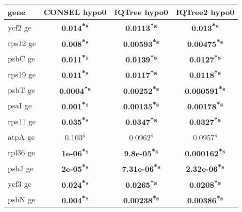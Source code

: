 \documentclass[a4paper]{article}
\begin{document}
\footnotesize
{}
\begin{longtable}{l|c|c|c}
﻿gene&CONSEL hypo0&IQTree hypo0&IQTree2 hypo0\\
\hline
\endhead
ycf2 ge&\textbf{0.014\textsuperscript{*}\textsuperscript{s}}&\textbf{0.0113\textsuperscript{*}\textsuperscript{s}}&\textbf{0.013\textsuperscript{*}\textsuperscript{s}}\\
rps12 ge&\textbf{0.008\textsuperscript{*}\textsuperscript{s}}&\textbf{0.00593\textsuperscript{*}\textsuperscript{s}}&\textbf{0.00475\textsuperscript{*}\textsuperscript{s}}\\
psbC ge&\textbf{0.011\textsuperscript{*}\textsuperscript{s}}&\textbf{0.0139\textsuperscript{*}\textsuperscript{s}}&\textbf{0.0127\textsuperscript{*}\textsuperscript{s}}\\
rps19 ge&\textbf{0.011\textsuperscript{*}\textsuperscript{s}}&\textbf{0.0117\textsuperscript{*}\textsuperscript{s}}&\textbf{0.0118\textsuperscript{*}\textsuperscript{s}}\\
psbT ge&\textbf{0.0004\textsuperscript{*}\textsuperscript{s}}&\textbf{0.00252\textsuperscript{*}\textsuperscript{s}}&\textbf{0.000591\textsuperscript{*}\textsuperscript{s}}\\
psaI ge&\textbf{0.001\textsuperscript{*}\textsuperscript{s}}&\textbf{0.00135\textsuperscript{*}\textsuperscript{s}}&\textbf{0.00178\textsuperscript{*}\textsuperscript{s}}\\
rps11 ge&\textbf{0.035\textsuperscript{*}\textsuperscript{s}}&\textbf{0.0347\textsuperscript{*}\textsuperscript{s}}&\textbf{0.0327\textsuperscript{*}\textsuperscript{s}}\\
atpA ge&0.103\textsuperscript{s}&0.0962\textsuperscript{s}&0.0957\textsuperscript{s}\\
rpl36 ge&\textbf{1e-06\textsuperscript{*}\textsuperscript{s}}&\textbf{9.8e-05\textsuperscript{*}\textsuperscript{s}}&\textbf{0.000162\textsuperscript{*}\textsuperscript{s}}\\
psbJ ge&\textbf{2e-05\textsuperscript{*}\textsuperscript{s}}&\textbf{7.31e-06\textsuperscript{*}\textsuperscript{s}}&\textbf{2.32e-06\textsuperscript{*}\textsuperscript{s}}\\
ycf3 ge&\textbf{0.024\textsuperscript{*}\textsuperscript{s}}&\textbf{0.0265\textsuperscript{*}\textsuperscript{s}}&\textbf{0.0208\textsuperscript{*}\textsuperscript{s}}\\
psbN ge&\textbf{0.004\textsuperscript{*}\textsuperscript{s}}&\textbf{0.00238\textsuperscript{*}\textsuperscript{s}}&\textbf{0.00386\textsuperscript{*}\textsuperscript{s}}\\

\end{longtable}
\end{document}
